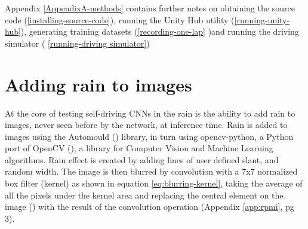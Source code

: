 Appendix \ref{AppendixA-methods} contains further notes on obtaining the source code (\ref{installing-source-code}), running the Unity Hub utility (\ref{running-unity-hub}), generating training datasets (\ref{recording-one-lap} )and running the driving simulator (
\ref{running-driving simulator})






\section{Adding rain to images}
\label{methods:AddingRainToImages}
At the core of testing self-driving CNNs in the rain is the ability to add rain to images, never seen before by the network, at inference time.
Rain is added to images using the Automould (\cite{Saxena2017}) library, in turn using opencv-python, a Python port of OpenCV (\cite{mordvintsev2014opencv}), a library for Computer Vision and Machine Learning algorithms. Rain effect is created by adding lines of user defined slant, and random width. The image is then blurred by convolution with a 7x7 normalized box filter (kernel) as shown in equation \ref{eq:blurring-kernel}, taking the average of all the pixels under the kernel area and replacing the central element on the image (\cite{documentationOpenCV2020}) with the result of the convolution operation (Appendix \ref{app:rpmi}, pg 3).

